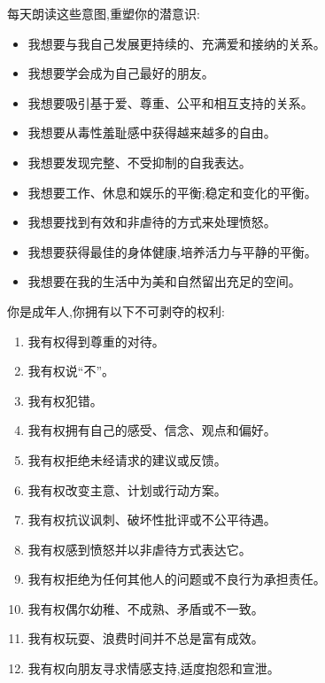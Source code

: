 \documentclass[11pt, a4paper]{article}
\begin{document}
\begin{softbox}
每天朗读这些意图,重塑你的潜意识:
\begin{itemize}
    \item 我想要与我自己发展更持续的、充满爱和接纳的关系。
    \item 我想要学会成为自己最好的朋友。
    \item 我想要吸引基于爱、尊重、公平和相互支持的关系。
    \item 我想要从毒性羞耻感中获得越来越多的自由。
    \item 我想要发现完整、不受抑制的自我表达。
    \item 我想要工作、休息和娱乐的平衡;稳定和变化的平衡。
    \item 我想要找到有效和非虐待的方式来处理愤怒。
    \item 我想要获得最佳的身体健康,培养活力与平静的平衡。
    \item 我想要在我的生活中为美和自然留出充足的空间。
\end{itemize}
\end{softbox}

\vspace{0.3cm}

\begin{softbox}
你是成年人,你拥有以下不可剥夺的权利:
\begin{enumerate}
    \item 我有权得到尊重的对待。
    \item 我有权说“不”。
    \item 我有权犯错。
    \item 我有权拥有自己的感受、信念、观点和偏好。
    \item 我有权拒绝未经请求的建议或反馈。
    \item 我有权改变主意、计划或行动方案。
    \item 我有权抗议讽刺、破坏性批评或不公平待遇。
    \item 我有权感到愤怒并以非虐待方式表达它。
    \item 我有权拒绝为任何其他人的问题或不良行为承担责任。
    \item 我有权偶尔幼稚、不成熟、矛盾或不一致。
    \item 我有权玩耍、浪费时间并不总是富有成效。
    \item 我有权向朋友寻求情感支持,适度抱怨和宣泄。
\end{enumerate}
\end{softbox}
\end{document}
